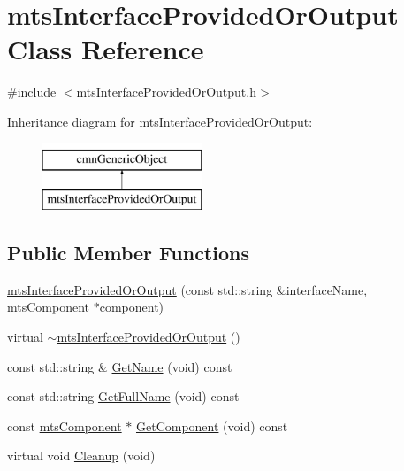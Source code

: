 \hypertarget{classmts_interface_provided_or_output}{}\section{mts\+Interface\+Provided\+Or\+Output Class Reference}
\label{classmts_interface_provided_or_output}


{\ttfamily \#include $<$mts\+Interface\+Provided\+Or\+Output.\+h$>$}

Inheritance diagram for mts\+Interface\+Provided\+Or\+Output\+:\begin{figure}[H]
\begin{center}
\leavevmode
\includegraphics[height=2.000000cm]{d8/dfb/classmts_interface_provided_or_output}
\end{center}
\end{figure}
\subsection*{Public Member Functions}
\begin{DoxyCompactItemize}
\item 
\hyperlink{classmts_interface_provided_or_output_a9d5aa45e318eb16a6e6afdcf688efbda}{mts\+Interface\+Provided\+Or\+Output} (const std\+::string \&interface\+Name, \hyperlink{classmts_component}{mts\+Component} $\ast$component)
\item 
virtual \hyperlink{classmts_interface_provided_or_output_a4953dec717e3348fdef378fae9232d99}{$\sim$mts\+Interface\+Provided\+Or\+Output} ()
\item 
const std\+::string \& \hyperlink{classmts_interface_provided_or_output_abb27c5aa42f5455c63a66d8f986fadb2}{Get\+Name} (void) const 
\item 
const std\+::string \hyperlink{classmts_interface_provided_or_output_a1f1f631e3d1985e128ef2ee2d39966ef}{Get\+Full\+Name} (void) const 
\item 
const \hyperlink{classmts_component}{mts\+Component} $\ast$ \hyperlink{classmts_interface_provided_or_output_ab98232c55ca1a9a34db8617e88c384fa}{Get\+Component} (void) const 
\item 
virtual void \hyperlink{classmts_interface_provided_or_output_a01881e22671baa8b2d291491b907395a}{Cleanup} (void)
\end{DoxyCompactItemize}

